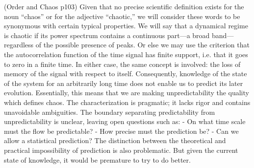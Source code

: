 \documentclass[12pt,twoside]{book}
\begin{document}
(Order and Chaos p103)
Given that no precise scientific definition exists for the noun ``chaos'' or for the adjective ``chaotic,'' we will consider these words to be synonymous with certain typical properties.
We will say that a dynamical regime is chaotic if its power spectrum contains a continuous part---a broad band---regardless of the possible presence of peaks.
Or else we may use the criterion that the autocorrelation function of the time signal has finite support, i.e. that it goes to zero in a finite time.
In either case, the same concept is involved: the loss of memory of the signal with respect to itself.
Consequently, knowledge of the state of the system for an arbitrarily long time does not enable us to predict its later evolution.
Essentially, this means that we are making unpredictability the quality which defines chaos.
The characterization is pragmatic; it lacks rigor and contains unavoidable ambiguities.
The boundary separating predictability from unpredictability is unclear, leaving open questions such as:
- On what time scale must the flow be predictable?
- How precise must the prediction be?
- Can we allow a statistical prediction?
The distinction between the theoretical and practical impossibility of prediction is also problematic.
But given the current state of knowledge, it would be premature to try to do better.





\end{document}

